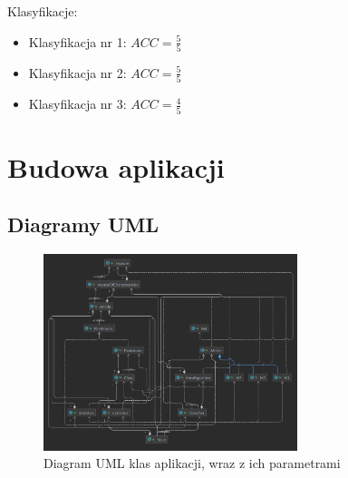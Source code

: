 \documentclass{classrep}
\begin{document}
Klasyfikacje:
\begin{itemize}
\item Klasyfikacja nr 1:
$ACC = \frac{5}{5}$ \\
\item Klasyfikacja nr 2:
$ACC = \frac{5}{5}$\\
\item Klasyfikacja nr 3:
$ACC = \frac{4}{5}$
\end{itemize}


\section{Budowa aplikacji}
\subsection{Diagramy UML}

\begin{figure}[ht]
\centering
\includegraphics[width=0.66\textwidth]{uml2.png}
\caption{Diagram UML klas aplikacji, wraz z ich parametrami}
\label{fig1}
\end{figure}
\end{document}
